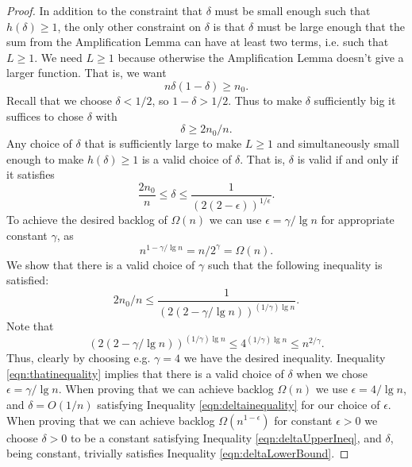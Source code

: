\begin{proof}
In addition to the constraint that $\delta$ must be small enough such that
$h(\delta) \ge 1$, the only other constraint on $\delta$ is that $\delta$
must be large enough that the sum from the Amplification Lemma can have at least
two terms, i.e. such that $L \ge 1$. We need $L\ge 1$ because otherwise the
Amplification Lemma doesn't give a larger function.
That is, we want
$$n\delta(1-\delta) \ge n_0. $$
Recall that we choose $\delta < 1/2$, so $1-\delta > 1/2$. Thus to make
$\delta$ sufficiently big it suffices to chose $\delta$ with 
\begin{equation}
  \label{eqn:deltaLowerBound}
  \delta \ge 2n_0/n.
\end{equation}
Any choice of $\delta$ that is sufficiently large to make $L \ge 1$ and
simultaneously small enough to make $h(\delta) \ge 1$ is a valid choice of
$\delta$. That is, $\delta$ is valid if and only if it satisfies
\begin{equation}
  \label{eqn:deltainequality}
  \frac{2n_0}{n} \le \delta \le  \frac{1}{(2(2-\epsilon))^{1/\epsilon}}.
\end{equation}
To achieve the desired backlog of $\Omega(n)$ we can use $\epsilon =
\gamma/\lg n$ for appropriate constant $\gamma$, as $$n^{1-\gamma/\lg n} =
n/2^\gamma = \Omega(n).$$
We show that there is a valid choice of $\gamma$ such that the
following inequality is satisfied:
\begin{equation}
  \label{eqn:thatinequality}
 2n_0/n \le \frac{1}{(2(2-\gamma/\lg n))^{(1/\gamma)\lg n}}.
\end{equation}
Note that 
$$(2(2-\gamma/\lg n))^{(1/\gamma)\lg n} \le 4^{(1/\gamma)\lg n} \le n^{2/\gamma}.$$
Thus, clearly by choosing e.g. $\gamma = 4$ we have the desired inequality.
Inequality \ref{eqn:thatinequality} implies that there is a valid choice of
$\delta$ when we chose $\epsilon = \gamma / \lg n$. When proving that we can
achieve backlog $\Omega(n)$ we use $\epsilon = 4 / \lg n$, and $\delta =
O(1/n)$ satisfying Inequality \ref{eqn:deltainequality} for our choice
of $\epsilon$. When proving that we can achieve backlog
$\Omega(n^{1-\epsilon})$ for constant $\epsilon > 0$ we choose $\delta > 0$ to be
a constant satisfying Inequality \ref{eqn:deltaUpperIneq}, and $\delta$,
being constant, trivially satisfies Inequality \ref{eqn:deltaLowerBound}.
  
\end{proof}

